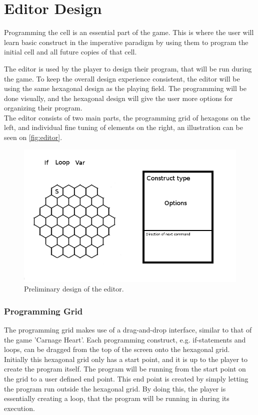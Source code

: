 \section{Editor Design}
\label{sec:editor_design}
Programming the cell is an essential part of the game. This is where the user will learn basic construct in the imperative paradigm by using them to program the initial cell and all future copies of that cell.

The editor is used by the player to design their program, that will be run during the game. To keep the overall design experience consistent, the editor will be using the same hexagonal design as the playing field. The programming will be done visually, and the hexagonal design will give the user more options for organizing their program.\\

The editor consists of two main parts, the programming grid of hexagons on the left, and individual fine tuning of elements on the right, an illustration can be seen on \autoref{fig:editor}.

\begin{figure}[h]
\includegraphics[width=\textwidth]{img/editor.png}
\caption{Preliminary design of the editor.}
\label{fig:editor}
\end{figure}

\subsubsection*{Programming Grid}
The programming grid makes use of a drag-and-drop interface, similar to that of the game 'Carnage Heart'.
Each programming construct, e.g. if-statements and loops, can be dragged from the top of the screen onto the hexagonal grid.
Initially this hexagonal grid only has a start point, and it is up to the player to create the program itself.
The program will be running from the start point on the grid to a user defined end point.
This end point is created by simply letting the program run outside the hexagonal grid.
By doing this, the player is essentially creating a loop, that the program will be running in during its execution.

